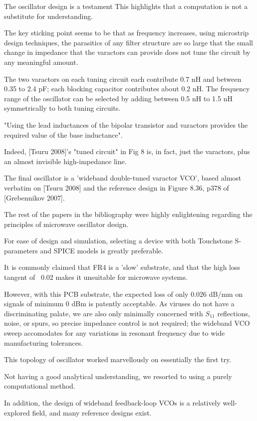 \documentclass[paper.tex]{subfiles}
\begin{document}
The oscillator design is a testament  This highlights that a computation is not a substitute for understanding.

The key sticking point seems to be that as frequency increases, using microstrip design techniques, the parasitics of any filter structure are so large that the small change in impedance that the varactors can provide does not tune the circuit by any meaningful amount.

The two varactors on each tuning circuit each contribute 0.7 nH and between 0.35 to 2.4 pF; each blocking capacitor contributes about 0.2 nH. The frequency range of the oscillator can be selected by adding between 0.5 nH to 1.5 nH symmetrically to both tuning circuits. 

"Using the lead inductances of the bipolar transistor and varactors provides the required value of the base inductance".

Indeed, [Tsuru 2008]'s "tuned circuit" in Fig 8 is, in fact, just the varactors, plus an almost invisible high-impedance line.


The final oscillator is a 'wideband double-tuned varactor VCO', based almost verbatim on [Tsuru 2008] and the reference design in Figure 8.36, p378 of [Grebennikov 2007]. 



The rest of the papers in the bibliography were highly enlightening regarding the principles of microwave oscillator design.

For ease of design and simulation, selecting a device with both Touchstone S-parameters and SPICE models is greatly preferable.

It is commonly claimed that FR4 is a 'slow' substrate, and that the high loss tangent of ~0.02 makes it unsuitable for microwave systems.

However, with this PCB substrate, the expected loss of only 0.026 dB/mm on signals of minimum 0 dBm is patently acceptable. As viruses do not have a discriminating palate, we are also only minimally concerned with $S_{11}$ reflections, noise, or spurs, so precise impedance control is not required; the wideband VCO sweep accomodates for any variations in resonant frequency due to wide manufacturing tolerances.


This topology of oscillator worked marvellously on essentially the first try.

Not having a good analytical understanding, we resorted to using a purely computational method.

In addition, the design of wideband feedback-loop VCOs is a relatively well-explored field, and many reference designs exist. 
\end{document}
